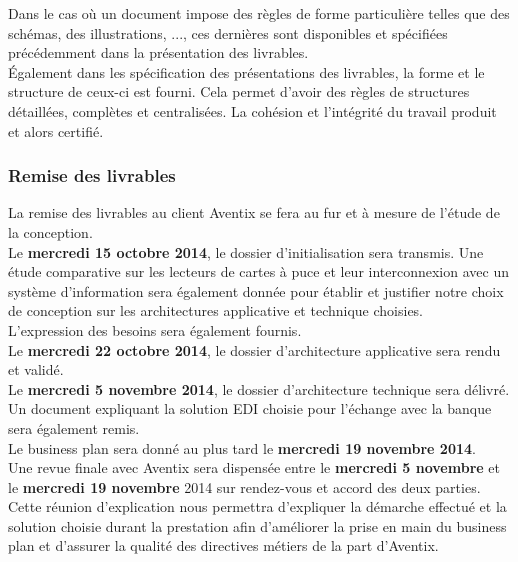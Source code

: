 Dans le cas où un document impose des règles de forme particulière telles que
des schémas, des illustrations, ..., ces dernières sont disponibles et
spécifiées précédemment dans la présentation des livrables. \\

Également dans les spécification des présentations des livrables, la forme et
le structure de ceux-ci est fourni. Cela permet d'avoir des règles de
structures détaillées, complètes et centralisées. La cohésion et l'intégrité du
travail produit et alors certifié. \\

\subsubsection{Remise des livrables}
La remise des livrables au client Aventix se fera au fur et à mesure de l'étude
de la conception. \\

Le \textbf{mercredi 15 octobre 2014}, le dossier d'initialisation sera transmis.
Une étude comparative sur les lecteurs de cartes à puce et leur interconnexion
avec un système d'information sera également donnée pour établir et justifier
notre choix de conception sur les architectures applicative et technique
choisies. \\
L'expression des besoins sera également fournis. \\

Le \textbf{mercredi 22 octobre 2014}, le dossier d'architecture applicative sera rendu
et validé. \\

Le \textbf{mercredi 5 novembre 2014}, le dossier d'architecture technique sera délivré.
Un document expliquant la solution EDI choisie pour l'échange avec la banque
sera également remis. \\

Le business plan sera donné au plus tard le \textbf{mercredi 19 novembre 2014}. \\

Une revue finale avec Aventix sera dispensée entre le \textbf{mercredi 5
  novembre} et le \textbf{mercredi 19 novembre} 2014 sur rendez-vous et accord
des deux parties.  Cette réunion d'explication nous permettra d'expliquer la
démarche effectué et la solution choisie durant la prestation afin d'améliorer
la prise en main du business plan et d'assurer la qualité des directives
métiers de la part d'Aventix. \\

